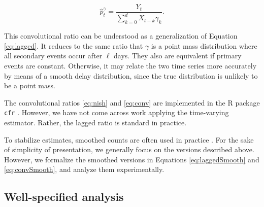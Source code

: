 \documentclass{article}
\begin{document}
\begin{equation}\label{eq:conv}
    \hat{p}_t^{\gamma} = \frac{Y_t}{\sum_{k=0}^d X_{t-k}\gamma_k}.%
\end{equation}

\noindent This convolutional ratio can be understood as a generalization of Equation \ref{eq:lagged}. It reduces to the same ratio that ${\gamma}$ is a point mass distribution where all secondary events occur after $\ell$ days. They also are equivalent if primary events are constant. Otherwise, it may relate the two time series more accurately by means of a smooth delay distribution, since the true distribution is unlikely to be a point mass. 

The convolutional ratios \ref{eq:nish} and \ref{eq:conv} are implemented in the R package \texttt{cfr} \citep{cfr_package}. However, we have not come across work applying the time-varying estimator. Rather, the lagged ratio is standard in practice.


To stabilize estimates, smoothed counts are often used in practice \citep{germany,timevar_ifr,LIU2023100350}. For the sake of simplicity of presentation, we generally focus on the versions described above. However, we formalize the smoothed versions in Equations \ref{eq:laggedSmooth} and \ref{eq:convSmooth}, and analyze them experimentally.


\subsection{Well-specified analysis}\label{sec:analysis}
\end{document}
